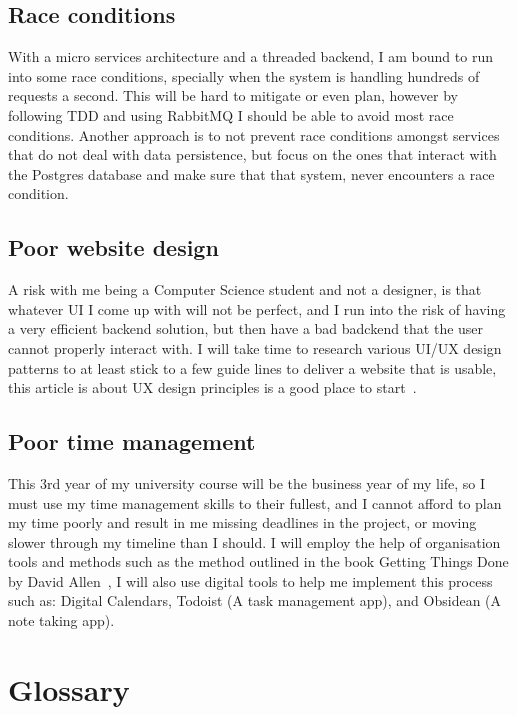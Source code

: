 \documentclass[titlepage]{article}
\begin{document}
\subsection{Race conditions}
With a micro services architecture and a threaded backend, I am bound to run into some race conditions, specially when the system is handling hundreds of requests a second. This will be hard to mitigate or even plan, however by following TDD and using RabbitMQ I should be able to avoid most race conditions. Another approach is to not prevent race conditions amongst services that do not deal with data persistence, but focus on the ones that interact with the Postgres database and make sure that that system, never encounters a race condition.

\subsection{Poor website design}
A risk with me being a Computer Science student and not a designer, is that whatever UI I come up with will not be perfect, and I run into the risk of having a very efficient backend solution, but then have a bad badckend that the user cannot properly interact with. I will take time to research various UI/UX design patterns to at least stick to a few guide lines to deliver a website that is usable, this article is about UX design principles is a good place to start~\cite{ux}.

\subsection{Poor time management}
This 3rd year of my university course will be the business year of my life, so I must use my time management skills to their fullest, and I cannot afford to plan my time poorly and result in me missing deadlines in the project, or moving slower through my timeline than I should. I will employ the help of organisation tools and methods such as the method outlined in the book Getting Things Done by David Allen~\cite{gtd}, I will also use digital tools to help me implement this process such as: Digital Calendars, Todoist (A task management app), and Obsidean (A note taking app).

\pagebreak

\section{Glossary}
\end{document}
